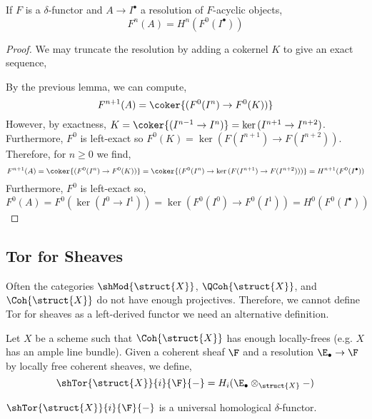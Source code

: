 \documentclass[12pt]{article}
\begin{document}
\begin{theorem}[acyclicity]
If $F$ is a $\delta$-functor and $A \to I^\bullet$ a resolution of $F$-acyclic objects,
\[ F^n(A) = H^n(F^0(I^\bullet)) \]
\end{theorem}

\begin{proof}
We may truncate the resolution by adding a cokernel $K$ to give an exact sequence,
\begin{center}
\end{center}
By the previous lemma, we can compute,
\[ F^{n+1}(A) = \coker{(F^0(I^n) \to F^0(K))} \]
However, by exactness, $K = \coker{(I^{n-1} \to I^n)} = \ker{(I^{n+1} \to I^{n+2})}$. Furthermore, $F^0$ is left-exact so $F^0(K) = \ker{(F(I^{n+1}) \to F(I^{n+2}))}$. Therefore, for $n \ge 0$ we find,
\[ F^{n+1}(A) = \coker{(F^0(I^n) \to F^0(K))} = \coker{(F^0(I^n) \to \ker{(F(I^{n+1}) \to F(I^{n+2}))})} = H^{n+1}(F^0(I^\bullet)) \]
Furthermore, $F^0$ is left-exact so,
\[ F^0(A) = F^0(\ker{(I^0 \to I^1)}) = \ker{(F^0(I^0) \to F^0(I^1))} = H^0(F^0(I^\bullet)) \]
\end{proof}

\subsection{Tor for Sheaves}

\begin{remark}
Often the categories $\shMod{\struct{X}}$, $\QCoh{\struct{X}}$, and $\Coh{\struct{X}}$ do not have enough projectives. Therefore, we cannot define Tor for sheaves as a left-derived functor we need an alternative definition.  
\end{remark}

\begin{defn}
Let $X$ be a scheme such that $\Coh{\struct{X}}$ has enough locally-frees (e.g. $X$ has an ample line bundle). Given a coherent sheaf $\F$ and a resolution $\E_\bullet \to \F$ by locally free coherent sheaves, we define,
\[ \shTor{\struct{X}}{i}{\F}{-} = H_i( \E_\bullet \otimes_{\struct{X}} - ) \]
\end{defn}

\begin{prop}
$\shTor{\struct{X}}{i}{\F}{-}$ is a universal homological $\delta$-functor. 
\end{prop}
\end{document}
